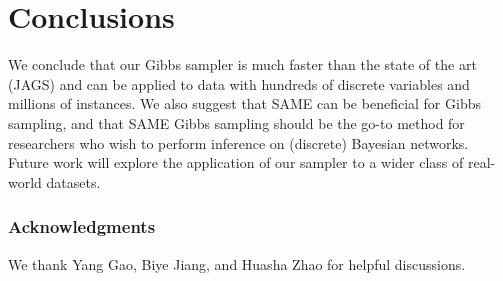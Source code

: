 \documentclass{article} %
\begin{document}
\section{Conclusions}\label{sec:conclusions}

We conclude that our Gibbs sampler is much faster than the state of
the art (JAGS) and can be applied to data with hundreds of discrete
variables and millions of instances. We also suggest that SAME can be
beneficial for Gibbs sampling, and that SAME Gibbs sampling should be
the go-to method for researchers who wish to perform inference on
(discrete) Bayesian networks. Future work will explore the application
of our sampler to a wider class of real-world datasets.


\subsubsection*{Acknowledgments}

We thank Yang Gao, Biye Jiang, and Huasha Zhao for helpful discussions.












%




\end{document}
